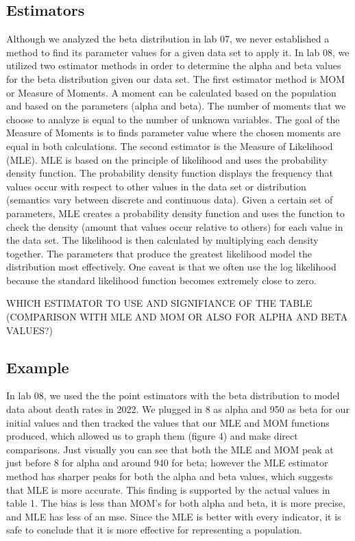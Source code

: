 \documentclass{article}\usepackage[]{graphicx}\usepackage[]{xcolor}
\begin{document}
\begin{multicols}{2}
\section{Estimators}
  Although we analyzed the beta distribution in lab 07, we never established a method to find its parameter values for a given data set to apply it. In lab 08, we utilized two estimator methods in order to determine the alpha and beta values for the beta distribution given our data set. The first estimator method is MOM or Measure of Moments. A moment can be calculated based on the population and based on the parameters (alpha and beta). The number of moments that we choose to analyze is equal to the number of unknown variables. The goal of the Measure of Moments is to finds parameter value where the chosen moments are equal in both calculations. The second estimator is the Measure of Likelihood (MLE). MLE is based on the principle of likelihood and uses the probability density function. The probability density function displays the frequency that values occur with respect to other values in the data set or distribution (semantics vary between discrete and continuous data). Given a certain set of parameters, MLE creates a probability density function and uses the function to check the density (amount that values occur relative to others) for each value in the data set. The likelihood is then calculated by multiplying each density together. The parameters that produce the greatest likelihood model the distribution most effectively. One caveat is that we often use the log likelihood because the standard likelihood function becomes extremely close to zero. 
   
WHICH ESTIMATOR TO USE
AND SIGNIFIANCE OF THE TABLE (COMPARISON WITH MLE AND MOM OR ALSO FOR ALPHA AND BETA VALUES?)
\subsection{Example}
  In lab 08, we used the the point estimators with the beta distribution to model data about death rates in 2022. We plugged in 8 as alpha and 950 as beta for our initial values and then tracked the values that our MLE and MOM functions produced, which allowed us to graph them (figure 4) and make direct comparisons. Just visually you can see that both the MLE and MOM peak at just before 8 for alpha and around 940 for beta; however the MLE estimator method has sharper peaks for both the alpha and beta values, which suggests that MLE is more accurate. This finding is supported by the actual values in table 1. The bias is less than MOM's for both alpha and beta, it is more precise, and MLE has less of an mse. Since the MLE is better with every indicator, it is safe to conclude that it is more effective for representing a population. 
  

\end{multicols}
\end{document}
